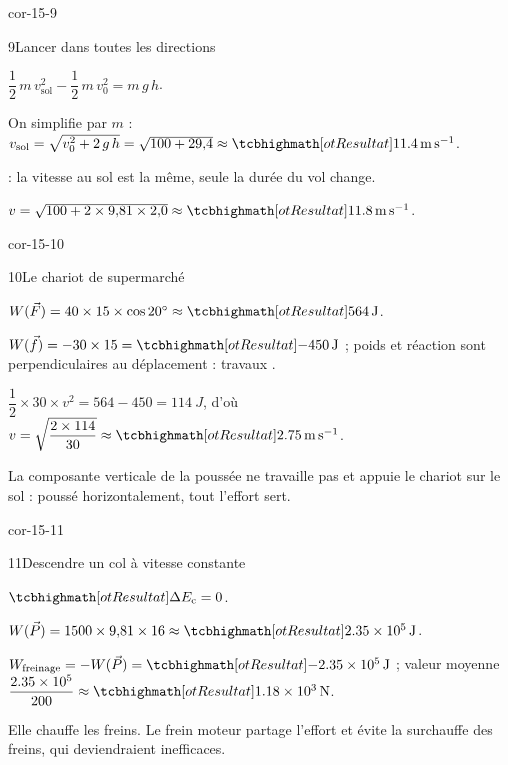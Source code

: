\begin{blocLivre}{cor-15-9}
\begin{corrige}{9}{Lancer dans toutes les directions}
\begin{questions}
\item $\dfrac{1}{2}\,m\,v_\mathrm{sol}^2-\dfrac{1}{2}\,m\,v_0^2=m\,g\,h$.
\item On simplifie par $m$ : $v_\mathrm{sol}=\sqrt{v_0^2+2\,g\,h}=\sqrt{100+29{,}4}\approx\res{\qty{11,4}{m.s^{-1}}}$.
\item {} : la vitesse au sol est la même, seule la durée du vol change.
\item $v=\sqrt{100+2\times9{,}81\times2{,}0}\approx\res{\qty{11,8}{m.s^{-1}}}$.
\end{questions}
\end{corrige}
\end{blocLivre}
\begin{blocLivre}{cor-15-10}
\begin{corrige}{10}{Le chariot de supermarché}
\begin{questions}
\item $W(\vec{F})=40\times15\times\cos\ang{20}\approx\res{\qty{564}{J}}$.
\item $W(\vec{f})=-30\times15=\res{\qty{-450}{J}}$ ; poids et réaction sont perpendiculaires au déplacement : travaux .
\item $\dfrac{1}{2}\times30\times v^2=564-450=\qty{114}{J}$, d'où $v=\sqrt{\dfrac{2\times114}{30}}\approx\res{\qty{2,75}{m.s^{-1}}}$.
\item La composante verticale de la poussée ne travaille pas et appuie le chariot sur le sol : poussé horizontalement, tout l'effort sert.
\end{questions}
\end{corrige}
\end{blocLivre}
\begin{blocLivre}{cor-15-11}
\begin{corrige}{11}{Descendre un col à vitesse constante}
\begin{questions}
\item $\res{\Delta E_\mathrm{c}=0}$.
\item $W(\vec{P})=1500\times9{,}81\times16\approx\res{\qty{2,35e5}{J}}$.
\item $W_\mathrm{freinage}=-W(\vec{P})=\res{\qty{-2,35e5}{J}}$ ; valeur moyenne $\dfrac{\num{2,35e5}}{200}\approx\res{\qty{1,18e3}{N}}$.
\item Elle chauffe les freins. Le frein moteur partage l'effort et évite la surchauffe des freins, qui deviendraient inefficaces.
\end{questions}
\end{corrige}
\end{blocLivre}
